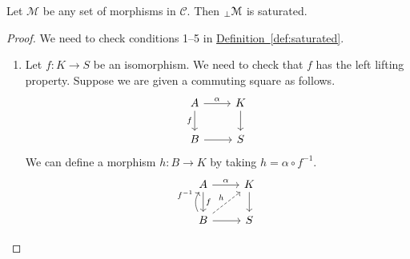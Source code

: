 \documentclass[main.tex]{subfiles}
\begin{document}
\begin{theorem}
  \label{thm:left_perp_is_saturated}
  Let $\mathcal{M}$ be any set of morphisms in $\mathcal{C}$. Then ${}_{\perp}\mathcal{M}$ is saturated.
\end{theorem}
\begin{proof}
  We need to check conditions 1--5 in \hyperref[def:saturated]{Definition~\ref*{def:saturated}}.
  \begin{enumerate}
    \item Let $f\colon K \to S$ be an isomorphism. We need to check that $f$ has the left lifting property. Suppose we are given a commuting square as follows.
      \begin{equation*}
        \begin{tikzcd}
          A
          \arrow[r, "\alpha"]
          \arrow[d, swap, "f"]
          & K
          \arrow[d]
          \\
          B
          \arrow[r]
          & S
        \end{tikzcd}
      \end{equation*}
      We can define a morphism $h\colon B \to K$ by taking $h = \alpha \circ f^{-1}$.
      \begin{equation*}
        \begin{tikzcd}
          A
          \arrow[r, "\alpha"]
          \arrow[d, "f"]
          & K
          \arrow[d]
          \\
          B
          \arrow[u, bend left, "f^{-1}"]
          \arrow[r]
          \arrow[ur, dashed, "h"]
          & S
        \end{tikzcd}
      \end{equation*}


\end{enumerate}
\end{proof}
\end{document}
